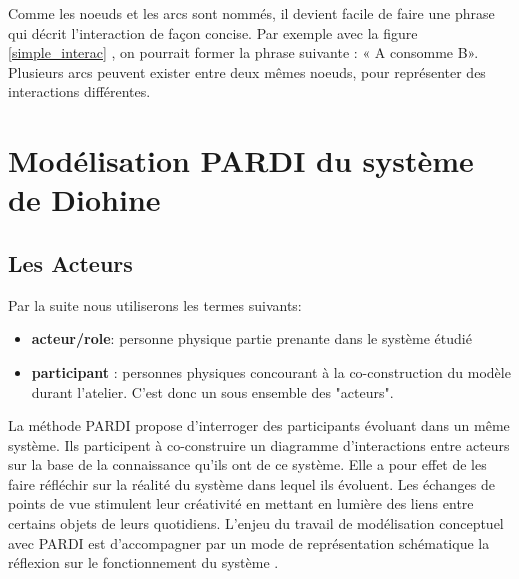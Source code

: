 Comme les noeuds et les arcs sont nommés, il devient facile de faire une phrase qui décrit l'interaction de façon concise. Par exemple avec la figure \ref{simple_interac} , on pourrait former la phrase suivante : « A consomme B». Plusieurs arcs peuvent exister entre deux mêmes noeuds, pour représenter des interactions différentes.

\section{Modélisation PARDI du système de Diohine}

\subsection{Les Acteurs}

Par la suite nous utiliserons les termes suivants:
\begin{itemize}
  \item \textbf{acteur/role}: personne physique partie prenante dans le système étudié
  \item \textbf{participant} : personnes physiques concourant à la co-construction du modèle durant l'atelier. C'est donc un sous ensemble des "acteurs".
\end{itemize}

\vspace{0.5cm}

La méthode PARDI propose d'interroger des participants évoluant dans un même système. Ils participent à co-construire un diagramme d'interactions entre acteurs sur la base de la connaissance qu'ils ont de ce système. Elle a pour effet de les faire réfléchir sur la réalité du système dans lequel ils évoluent. Les échanges de points de vue stimulent leur créativité en mettant en lumière des liens entre certains objets de leurs quotidiens. L'enjeu du travail de modélisation conceptuel avec PARDI est d'accompagner par un mode de représentation schématique la réflexion sur le fonctionnement du système \cite{becu_les_2010}.\\


